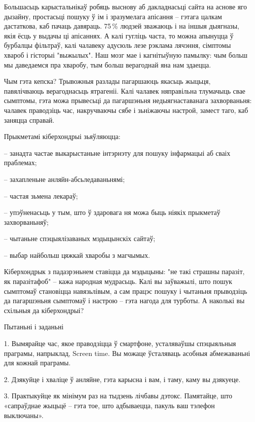 Большасьць карыстальнікаў робяць выснову аб дакладнасьці сайта на аснове яго дызайну, простасьці пошуку ў ім і зразумелага апісання – гэтага цалкам дастаткова, каб пачаць давяраць. 75\,\% людзей зважаюць і на іншыя дыягназы, якія ёсць у выдачы ці апісаннях. А калі гугліць часта, то можна апынуцца ў бурбалцы фільтраў, калі чалавеку адусюль лезе рэклама лячэння, сімптомы хвароб і гісторыі "выжылых". Наш мозг мае і кагнітыўную памылку: чым больш мы даведаемся пра хваробу, тым больш верагоднай яна нам здаецца.

Чым гэта кепска? Трывожныя разлады пагаршаюць якасьць жыцьця, павялічваюць верагоднасьць ятрагеніі. Калі чалавек няправільна тлумачыць свае сымптомы, гэта можа прывесьці да пагаршэньня недыягнаставанага захворваньня: чалавек праводзіць час, накручваючы сябе і зьніжаючы настрой, замест таго, каб заняцца справай. 

Прыкметамі кіберхондрыі зьяўляюцца: 

– занадта частае выкарыстаньне інтэрнэту для пошуку інфармацыі аб сваіх праблемах;

– захапленьне анляйн-абсьледаваньнямі;

– частая зьмена лекараў;

– упэўненасьць у тым, што ў здаровага ня можа быць ніякіх прыкметаў захворваньняў;

– чытаньне спэцыялізаваных мэдыцынскіх сайтаў;

– выбар найбольш цяжкай хваробы з магчымых.

Кіберхондрык з падазрэньнем ставіцца да мэдыцыны: "не такі страшны паразіт, як паразітафоб" – кажа народная мудрасьць. Калі вы заўважылі, што пошук сымптомаў становіцца навязьлівым, а сам працэс пошуку і чытаньня прыводзіць да пагаршэньня сымптомаў і настрою – гэта нагода для турботы. А наколькі вы схільныя да кіберхондрыі?

Пытаньні і заданьні

1. Вымярайце час, якое праводзіцца ў смартфоне, усталяваўшы спэцыяльныя праграмы, напрыклад, Screen time. Вы можаце ўсталяваць асобныя абмежаваньні для кожнай праграмы.

2. Дзякуйце і хваліце ў анляйне, гэта карысна і вам, і таму, каму вы дзякуеце.

3. Практыкуйце як мінімум раз на тыдзень лічбавы дэтокс. Памятайце, што «сапраўднае жыцьцё – гэта тое, што адбываецца, пакуль ваш тэлефон выключаны».

